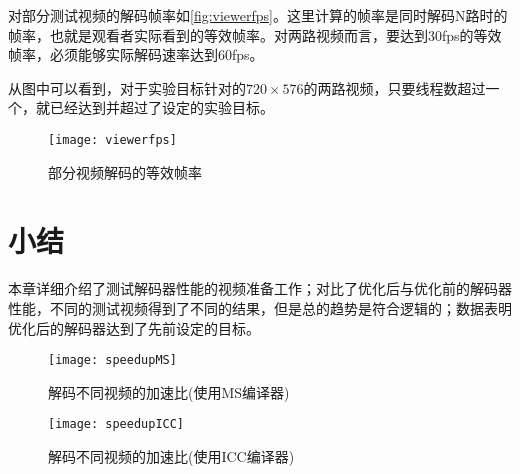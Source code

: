 对部分测试视频的解码帧率如\autoref{fig:viewerfps}。这里计算的帧率是同时解码N路时的帧率，也就是观看者实际看到的等效帧率。对两路视频而言，要达到30fps的等效帧率，必须能够实际解码速率达到60fps。

从图中可以看到，对于实验目标针对的$720\times 576$的两路视频，只要线程数超过一个，就已经达到并超过了设定的实验目标。

\begin{figure}[htbp]
\begin{center}
\texttt{[image: viewerfps]}
\caption{部分视频解码的等效帧率}
\label{fig:viewerfps}
\end{center}
\end{figure}

\section{小结}
\label{sec:sum6}

本章详细介绍了测试解码器性能的视频准备工作；对比了优化后与优化前的解码器性能，不同的测试视频得到了不同的结果，但是总的趋势是符合逻辑的；数据表明优化后的解码器达到了先前设定的目标。


\begin{figure}[htbp]
\begin{center}
\texttt{[image: speedupMS]}
\caption{解码不同视频的加速比(使用MS编译器)}
\label{fig:speedupMS2}
\end{center}
\end{figure}


\begin{figure}[htbp]
\begin{center}
\texttt{[image: speedupICC]}
\caption{解码不同视频的加速比(使用ICC编译器)}
\label{fig:speedupICC2}
\end{center}
\end{figure}


\cleardoublepage